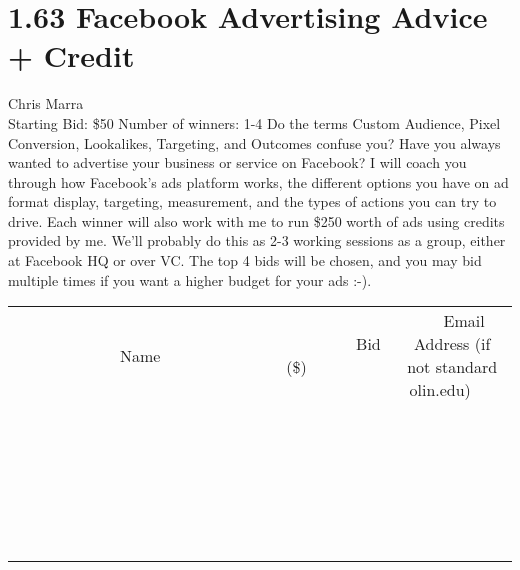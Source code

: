\documentclass[11pt]{article}
\begin{document}
\section*{1.63 Facebook Advertising Advice + Credit}
Chris Marra
\\
Starting Bid: \$50
\newline
Number of winners: 1-4
\newline
Do the terms Custom Audience, Pixel Conversion, Lookalikes, Targeting, and Outcomes confuse you? Have you always wanted to advertise your business or service on Facebook? I will coach you through how Facebook's ads platform works, the different options you have on ad format display, targeting, measurement, and the types of actions you can try to drive. Each winner will also work with me to run \$250 worth of ads using credits provided by me. We'll probably do this as 2-3 working sessions as a group, either at Facebook HQ or over VC. The top 4 bids will be chosen, and you may bid multiple times if you want a higher budget for your ads :-).
\\[6ex]
\begin{tabular}{c c c}
~~~~~~~~~~~~~Name~~~~~~~~~~~~~ & ~~~~~~~~~Bid (\$)~~~~~~~~~  & ~~~Email Address (if not standard olin.edu)~~~\\
 & & \\
\hline
 & & \\
\hline
 & & \\
\hline
 & & \\
\hline
 & & \\
\hline
 & & \\
\hline
 & & \\
\hline
 & & \\
\hline
 & & \\
\hline
 & & \\
\hline
 & & \\
\hline
 & & \\
\hline
 & & \\
\hline
 & & \\
\hline
 & & \\
\hline
 & & \\
\hline
 & & \\
\hline
 & & \\
\hline
 & & \\
\hline
 & & \\
\hline
 & & \\
\hline
 & & \\
\hline
 & & \\
\hline
 & & \\
\hline
 & & \\
\hline
 & & \\
\hline
\end{tabular}
\newpage
\end{document}
